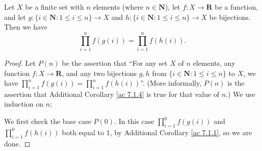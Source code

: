\begin{additional corollary}\label{ac 7.1.4}
Let \(X\) be a finite set with \(n\) elements (where \(n \in \mathbf{N}\)), let \(f : X \to \mathbf{R}\) be a function, and let \(g : \{i \in \mathbf{N} : 1 \leq i \leq n\} \to X\) and \(h : \{i \in \mathbf{N} : 1 \leq i \leq n\} \to X\) be bijections.
Then we have
\[
    \prod_{i = 1}^n f(g(i)) = \prod_{i = 1}^n f(h(i)).
\]
\end{additional corollary}

\begin{proof}
    Let \(P(n)\) be the assertion that ``For any set \(X\) of \(n\) elements, any function \(f : X \to \mathbf{R}\), and any two bijections \(g, h\) from \(\{i \in \mathbf{N} : 1 \leq i \leq n\}\) to \(X\), we have \(\prod_{i = 1}^n f(g(i)) = \prod_{i = 1}^n f(h(i))\)''.
    (More informally, \(P(n)\) is the assertion that Additional Corollary \ref{ac 7.1.4} is true for that value of \(n\).)
    We use induction on \(n\);

    We first check the base case \(P(0)\).
    In this case \(\prod_{i = 1}^0 f(g(i))\) and \(\prod_{i = 1}^0 f(h(i))\) both equal to \(1\), by Additional Corollary \ref{ac 7.1.1}, so we are done.


\end{proof}
